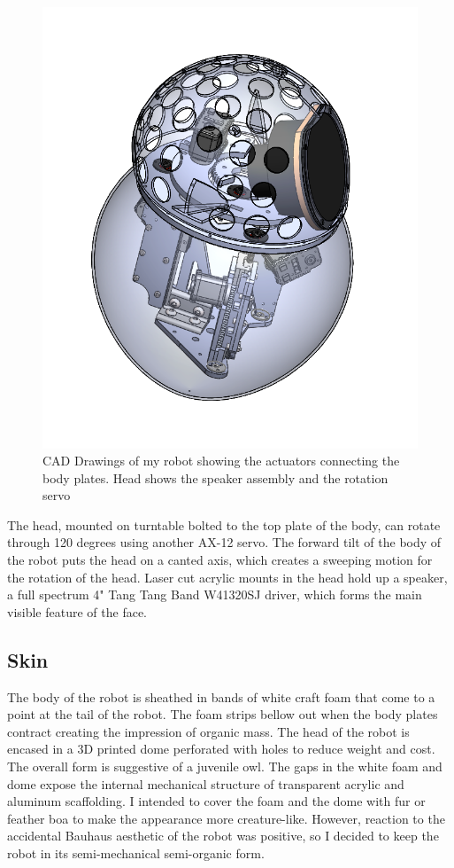   \begin{figure}[thpb]
      \centering
      \includegraphics[width=4.6in]{figures/design/solidworks_body.png}
      \caption{CAD Drawings of my robot showing the actuators connecting the body plates. Head shows the speaker assembly and the rotation servo}
      \label{fig_design_solidworks}
   \end{figure}



The head, mounted on turntable bolted to the top plate of the body, can rotate through 120 degrees using another AX-12 servo. The forward tilt of the body of the robot puts the head on a canted axis, which creates a sweeping motion for the rotation of the head. Laser cut acrylic mounts in the head hold up a speaker, a full spectrum 4" Tang Tang Band W4­1320SJ driver, which forms the main visible feature of the face. 

\subsection{Skin}

The body of the robot is sheathed in bands of white craft foam that come to a point at the tail of the robot. The foam strips bellow out when the body plates contract creating the impression of organic mass. The head of the robot is encased in a 3D printed dome perforated with holes to reduce weight and cost. The overall form is suggestive of a juvenile owl. The gaps in the white foam and dome expose the internal mechanical structure of transparent acrylic and aluminum scaffolding. I intended to cover the foam and the dome with fur or feather boa to make the appearance more creature-like. However,  reaction to the accidental Bauhaus aesthetic of the robot was positive, so I decided to keep the robot in its semi-mechanical semi-organic form. 

